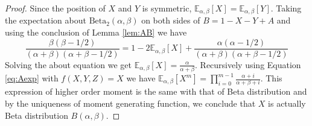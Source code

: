 \documentclass{elsarticle}
\def\E{\mathbb{E}}
\def\Beta{\textrm{Beta}}
\begin{document}
\begin{proof}
Since the position of $X$ and $Y$ is symmetric,
$\E_{\alpha, \beta}[X]=\E_{\alpha, \beta}[Y]$.
Taking the expectation about $\Beta_2(\alpha, \beta)$
on both sides of $B=1-X-Y+A$ and using the
conclusion of Lemma \ref{lem:AB} we have
\begin{equation*}
\frac{\beta(\beta-1/2)}{(\alpha+\beta)(\alpha+\beta-1/2)}
= 1 - 2\E_{\alpha, \beta}[X] +
\frac{\alpha(\alpha-1/2)}{(\alpha+\beta)(\alpha+\beta-1/2)}
\end{equation*}
Solving the about equation we get
$\E_{\alpha, \beta}[X]=\frac{\alpha}{\alpha + \beta}$.
Recursively using Equation \eqref{eq:Aexp} with $f(X,Y,Z)=X$
we have $\E_{\alpha, \beta}[X^m] =
\prod_{i=0}^{m-1}\frac{\alpha+i}{\alpha+\beta+i}$.
This expression of higher order moment
is the same with that of Beta distribution and by
the uniqueness of moment generating function, we
conclude that $X$ is actually Beta distribution $B(\alpha,
\beta)$.
\end{proof}
\end{document}
